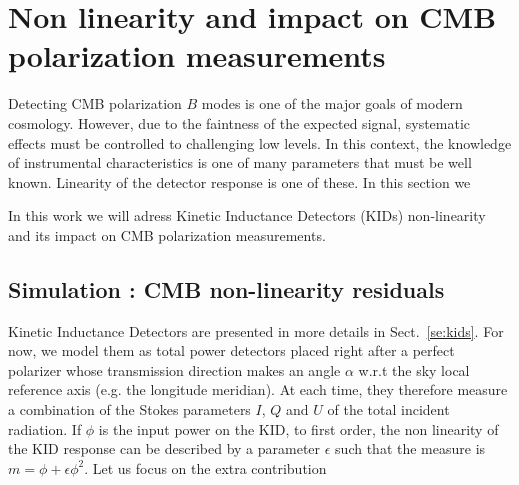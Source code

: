 
\section{Non linearity and impact on CMB polarization measurements}
\label{sec:cmb}



Detecting CMB polarization $B$ modes is one of the major goals of modern
cosmology. However, due to the faintness of the expected signal, systematic
effects must be controlled to challenging low levels. In this context, the
knowledge of instrumental characteristics is one of many parameters that must be
well known. Linearity of the detector response is one of these. In this section we 

 In this work we will adress Kinetic Inductance Detectors (KIDs) non-linearity and its impact on CMB polarization measurements.

\subsection{Simulation : CMB non-linearity residuals}

Kinetic Inductance Detectors are presented in more details in Sect.~\ref{se:kids}. For now, we model
them as total power detectors placed right after a perfect polarizer whose
transmission direction makes an angle $\alpha$ w.r.t the sky local reference
axis (e.g. the longitude meridian). At each time, they therefore measure a
combination of the Stokes parameters $I$, $Q$ and $U$ of the total incident
radiation. If $\phi$ is the input power on the KID, to first order, the non
linearity of the KID response can be described by a parameter $\epsilon$ such
that the measure is $m=\phi + \epsilon\phi^2$. Let us focus on the
extra contribution

